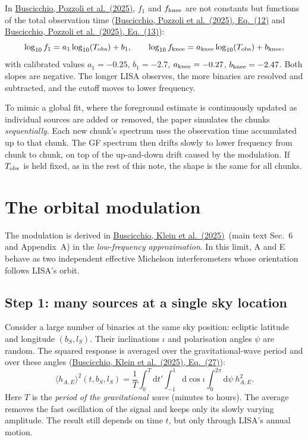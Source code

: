 \documentclass[11pt,a4paper]{article}
\newcommand{\urlPone}{https://arxiv.org/pdf/2511.03604}
\newcommand{\urlPtwo}{https://arxiv.org/pdf/2410.08263}
\newcommand{\Pone}{\href{\urlPone}{Buscicchio, Pozzoli et al.~(2025)}}
\newcommand{\Ptwo}{\href{\urlPtwo}{Buscicchio, Klein et al.~(2025)}}
\newcommand{\PoneEq}[1]{\href{\urlPone}{Buscicchio, Pozzoli et al.~(2025), Eq.~(#1)}}
\newcommand{\PtwoEq}[1]{\href{\urlPtwo}{Buscicchio, Klein et al.~(2025), Eq.~(#1)}}
\newcommand{\dd}{\mathrm{d}}
\begin{document}
\begin{remark}
In \Pone, $f_1$ and $f_{\rm knee}$ are not constants but functions of the total
observation time (\PoneEq{12} and \PoneEq{13}):
\begin{equation}
  \log_{10} f_1 = a_1 \log_{10}(T_{\rm obs}) + b_1, \qquad
  \log_{10} f_{\rm knee} = a_{\rm knee} \log_{10}(T_{\rm obs}) + b_{\rm knee},
\end{equation}
with calibrated values $a_1=-0.25$, $b_1=-2.7$, $a_{\rm knee}=-0.27$,
$b_{\rm knee}=-2.47$. Both slopes are negative. The longer LISA observes, the more
binaries are resolved and subtracted, and the cutoff moves to lower frequency.

To mimic a global fit, where the foreground estimate is continuously updated as
individual sources are added or removed, the paper simulates the chunks
\emph{sequentially}. Each new chunk's spectrum uses the observation time
accumulated up to that chunk. The GF spectrum then drifts slowly to lower frequency
from chunk to chunk, on top of the up-and-down drift caused by the modulation. If
$T_{\rm obs}$ is held fixed, as in the rest of this note, the shape is the same for
all chunks.
\end{remark}

\section{The orbital modulation}\label{sec:modulation}

The modulation is derived in \Ptwo\ (main text Sec.~6 and Appendix~A) in the
\emph{low-frequency approximation}. In this limit, A and E behave as two independent
effective Michelson interferometers whose orientation follows LISA's orbit.

\subsection{Step 1: many sources at a single sky location}

Consider a large number of binaries at the same sky position: ecliptic latitude and
longitude $(b_S,l_S)$. Their inclinations $\iota$ and polarisation angles $\psi$ are
random. The squared response is averaged over the gravitational-wave period and over
these angles (\PtwoEq{27}):
\begin{equation}
  \langle h_{A,E}\rangle^2(t,b_S,l_S) = \frac{1}{T}\int_0^T \dd t'
  \int_{-1}^{1}\dd\cos\iota \int_0^{2\pi}\dd\psi\ h^2_{A,E}.
  \label{eq:env27}
\end{equation}
Here $T$ is the \emph{period of the gravitational wave} (minutes to hours). The
average removes the fast oscillation of the signal and keeps only its slowly
varying amplitude. The result still depends on time $t$, but only through LISA's
annual motion.
\end{document}
